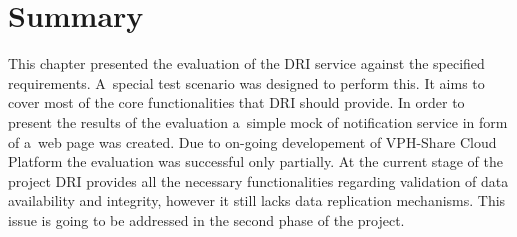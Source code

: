 \section{Summary}
This chapter presented the evaluation of the DRI service against the specified requirements. A~special
test scenario was designed to perform this. It aims to cover most of the core functionalities that
DRI should provide. In order to present the results of the evaluation a~simple mock of notification
service in form of a~web page was created. Due to on-going developement of VPH-Share Cloud Platform
the evaluation was successful only partially. At the current stage of the project DRI provides all
the necessary functionalities regarding validation of data availability and integrity, however it still
lacks data replication mechanisms. This issue is going to be addressed in the second phase of the
project.
